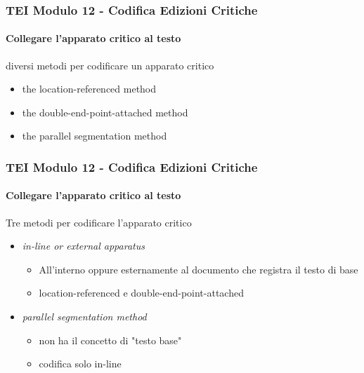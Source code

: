 \begin{frame}
    \frametitle{TEI Modulo 12 - Codifica Edizioni Critiche}
    \framesubtitle{Collegare l'apparato critico al testo}
    \addtocounter{nframe}{1}
    



    
    \begin{block}{diversi metodi per codificare un apparato critico}
       \begin{itemize}
           \item the location-referenced method
           \item the double-end-point-attached method
           \item the parallel segmentation method
       \end{itemize}
     \end{block}


\end{frame}


\begin{frame}
    \frametitle{TEI Modulo 12 - Codifica Edizioni Critiche}
    \framesubtitle{Collegare l'apparato critico al testo}
    \addtocounter{nframe}{1}
    
    \begin{block}{Tre metodi per codificare l'apparato critico}
       \begin{itemize}
           \item \textit{in-line or external apparatus}
           \begin{itemize}
             \item All'interno oppure esternamente al documento che registra il testo di base
             \item location-referenced e double-end-point-attached
           \end{itemize}
           \item  \textit{parallel segmentation method}
            \begin{itemize}
                \item non ha il concetto di "testo base"
                \item codifica solo in-line
            \end{itemize}
       \end{itemize}
     \end{block}

\end{frame}

